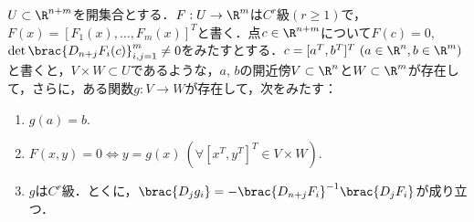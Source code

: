 \documentclass[a4paper,10pt]{ltjsarticle}
\begin{document}
\begin{MyTheorem}
  \(U \subset \R^{n+m}\)を開集合とする．\(F: U \to \R^m\)は\(C^r\)級$(r \ge 1)$で，$F(x) = [F_1(x), \dots, F_m(x)]^T$と書く．点\(c \in \R^{n+m}\)について\(F(c)=0\), \(\det\brac{D_{n+j}F_i(c)}_{i, j=1}^m \ne 0\)をみたすとする．\(c = [a^T, b^T]^T \ (a \in \R^n, b \in \R^m)\)と書くと，\(V \times W \subset U\)であるような，\(a\), \(b\)の開近傍\(V \subset \R^n\)と\(W \subset \R^m\)が存在して，さらに，ある関数\(g: V \to W\)が存在して，次をみたす：
  \begin{enumerate}
    \item \(g(a) = b\).
    \item \(F(x, y) = 0 \iff y = g(x) \ (\forall [x^T, y^T]^T \in V \times W)\).
    \item \(g\)は\(C^r\)級．とくに，\(\brac{D_jg_i} = -\brac{D_{n+j}F_i}^{-1}\brac{D_jF_i}\)が成り立つ．
  \end{enumerate}
\end{MyTheorem}
\end{document}
